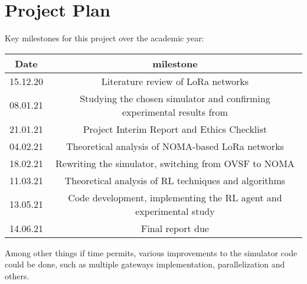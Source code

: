 \chapter{Project Plan}
Key milestones for this project over the academic year:

\begin{center}
\begin{tabular}{| c | c |}
\hline 
 \textbf{Date} & \textbf{milestone} \\ \hline 
 15.12.20 & Literature review of LoRa networks \\ \hline  
 08.01.21 & Studying the chosen simulator and confirming experimental results from \cite{simulator}\\ \hline 
 21.01.21 & Project Interim Report and Ethics Checklist\\ \hline 
 04.02.21 & Theoretical analysis of NOMA-based LoRa networks\\ \hline 
 18.02.21 & Rewriting the simulator, switching from OVSF to NOMA\\ \hline 
 11.03.21 & Theoretical analysis of RL techniques and algorithms \\ \hline 
 13.05.21 & Code development, implementing the RL agent and experimental study \\ \hline 
 14.06.21 & Final report due\\ \hline 
\end{tabular}
\end{center}

Among other things if time permits, various improvements to the simulator code could be done, such as multiple gateways implementation, parallelization and others.